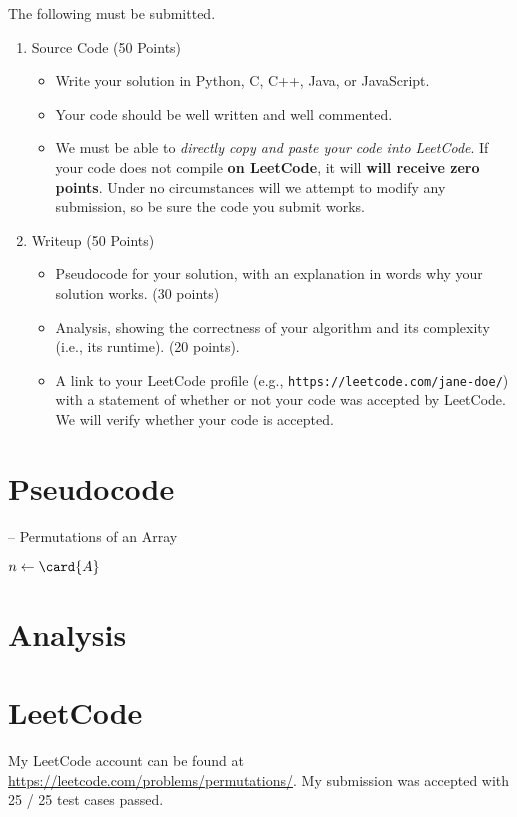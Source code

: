 \documentclass[final]{article}
\begin{document}
\begin{titlepage}
    The following must be submitted.
    \begin{enumerate}[label=\textbf{(\alph*)}]
        \item Source Code (50 Points)
              \begin{itemize}
                  \item Write your solution in Python, C, C++, Java, or JavaScript.
                  \item Your code should be well written and well commented.
                  \item We must be able to \emph{directly copy and paste your code into LeetCode}. If your code does not compile \textbf{on LeetCode}, it will \textbf{will receive zero points}. Under no circumstances will we attempt to modify any submission, so be sure the code you submit works.
              \end{itemize}
        \item Writeup (50 Points)
              \begin{itemize}
                  \item Pseudocode for your solution, with an explanation in words why your solution works. (30 points)
                  \item Analysis, showing the correctness of your algorithm and its complexity (i.e., its runtime). (20 points).
                  \item A link to your LeetCode profile (e.g., \texttt{https://leetcode.com/jane-doe/}) with a statement of whether or not your code was accepted by LeetCode. We will verify whether your code is accepted.
              \end{itemize}
    \end{enumerate}
\end{titlepage}

\section{Pseudocode}
\begin{algorithm}[H]
    \caption[]{ -- Permutations of an Array }
    \label{alg:permutations}
    \begin{algorithmic}[1]
        \State $n\gets\card{A}$
        \Else {}
        \EndIf
        \EndFunction
    \end{algorithmic}
\end{algorithm}
\section{Analysis}

\section{LeetCode}
My LeetCode account can be found at \url{https://leetcode.com/problems/permutations/}. My submission was accepted with 25 / 25 test cases passed.
\end{document}
